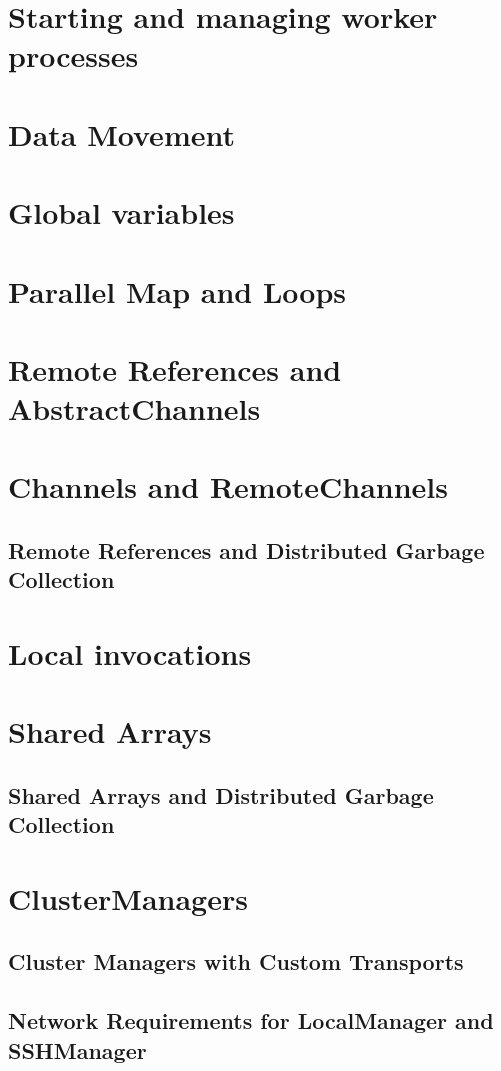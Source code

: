     \section{Starting and managing worker processes}
    \section{Data Movement}
    \section{Global variables}
    \section{Parallel Map and Loops}
    \section{Remote References and AbstractChannels}
    \section{Channels and RemoteChannels}
    \subsection{Remote References and Distributed Garbage Collection}
    \section{Local invocations}
    \section{Shared Arrays}
    \subsection{Shared Arrays and Distributed Garbage Collection}
    \section{ClusterManagers}
    \subsection{Cluster Managers with Custom Transports}
    \subsection{Network Requirements for LocalManager and SSHManager}

